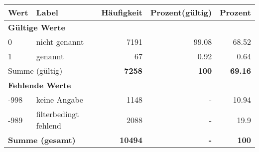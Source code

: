      \begin{longtable}{lXrrr}
     \toprule
     \textbf{Wert} & \textbf{Label} & \textbf{Häufigkeit} & \textbf{Prozent(gültig)} & \textbf{Prozent} \\
     \endhead
     \midrule
     \multicolumn{5}{l}{\textbf{Gültige Werte}}\\

     0 &
     \multicolumn{1}{X}{ nicht genannt   } &


       \num{7191} &
       \num[round-mode=places,round-precision=2]{99.08} &
         \num[round-mode=places,round-precision=2]{68.52} \\

     1 &
     \multicolumn{1}{X}{ genannt   } &


       \num{67} &
       \num[round-mode=places,round-precision=2]{0.92} &
         \num[round-mode=places,round-precision=2]{0.64} \\
     \midrule
     \multicolumn{2}{l}{Summe (gültig)} &
       \textbf{\num{7258}} &
     \textbf{\num{100}} &
       \textbf{\num[round-mode=places,round-precision=2]{69.16}} \\
     \multicolumn{5}{l}{\textbf{Fehlende Werte}}\\
       -998 &
       keine Angabe &
         \num{1148} &
        - &
         \num[round-mode=places,round-precision=2]{10.94} \\
       -989 &
       filterbedingt fehlend &
         \num{2088} &
        - &
         \num[round-mode=places,round-precision=2]{19.9} \\
     \midrule
     \multicolumn{2}{l}{\textbf{Summe (gesamt)}} &
          \textbf{\num{10494}} &
        \textbf{-} &
        \textbf{\num{100}} \\
     \bottomrule
     \end{longtable}
     
